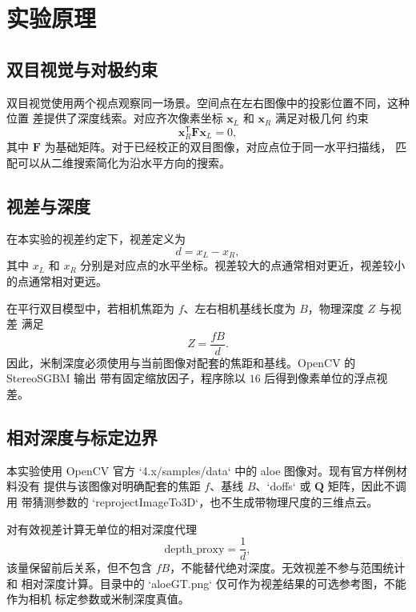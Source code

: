 \section{实验原理}

\subsection{双目视觉与对极约束}

双目视觉使用两个视点观察同一场景。空间点在左右图像中的投影位置不同，这种位置
差提供了深度线索。对应齐次像素坐标 $\mathbf{x}_L$ 和 $\mathbf{x}_R$ 满足对极几何
约束
\begin{equation}
  \mathbf{x}_R^{\mathsf{T}}\mathbf{F}\mathbf{x}_L=0,
\end{equation}
其中 $\mathbf{F}$ 为基础矩阵。对于已经校正的双目图像，对应点位于同一水平扫描线，
匹配可以从二维搜索简化为沿水平方向的搜索。

\subsection{视差与深度}

在本实验的视差约定下，视差定义为
\begin{equation}
  d=x_L-x_R,
\end{equation}
其中 $x_L$ 和 $x_R$ 分别是对应点的水平坐标。视差较大的点通常相对更近，视差较小
的点通常相对更远。

在平行双目模型中，若相机焦距为 $f$、左右相机基线长度为 $B$，物理深度 $Z$ 与视差
满足
\begin{equation}
  Z=\frac{fB}{d}.
  \label{eq:metric-depth}
\end{equation}
因此，米制深度必须使用与当前图像对配套的焦距和基线。OpenCV 的 StereoSGBM 输出
带有固定缩放因子，程序除以 $16$ 后得到像素单位的浮点视差。

\subsection{相对深度与标定边界}

本实验使用 OpenCV 官方 `4.x/samples/data` 中的 aloe 图像对。现有官方样例材料没有
提供与该图像对明确配套的焦距 $f$、基线 $B$、`doffs` 或 $\mathbf{Q}$ 矩阵，因此不调用
带猜测参数的 `reprojectImageTo3D`，也不生成带物理尺度的三维点云。

对有效视差计算无单位的相对深度代理
\begin{equation}
  \mathrm{depth\_proxy}=\frac{1}{d},
  \label{eq:proxy-depth}
\end{equation}
该量保留前后关系，但不包含 $fB$，不能替代绝对深度。无效视差不参与范围统计和
相对深度计算。目录中的 `aloeGT.png` 仅可作为视差结果的可选参考图，不能作为相机
标定参数或米制深度真值。
